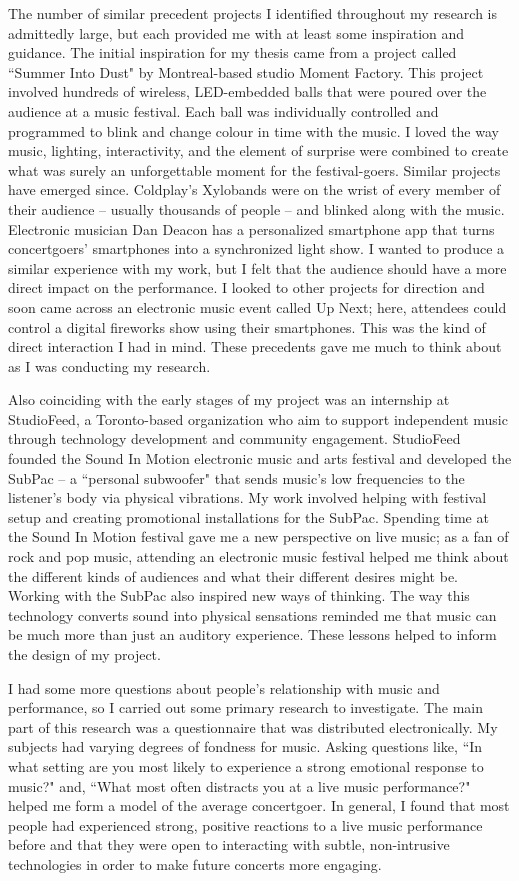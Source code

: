 The number of similar precedent projects I identified throughout my research is admittedly large, but each provided me with at least some inspiration and guidance. The initial inspiration for my thesis came from a project called ``Summer Into Dust" by Montreal-based studio Moment Factory. This project involved hundreds of wireless, LED-embedded balls that were poured over the audience at a music festival. Each ball was individually controlled and programmed to blink and change colour in time with the music. I loved the way music, lighting, interactivity, and the element of surprise were combined to create what was surely an unforgettable moment for the festival-goers. Similar projects have emerged since. Coldplay's Xylobands were on the wrist of every member of their audience -- usually thousands of people -- and blinked along with the music. Electronic musician Dan Deacon has a personalized smartphone app that turns concertgoers' smartphones into a synchronized light show. I wanted to produce a similar experience with my work, but I felt that the audience should have a more direct impact on the performance. I looked to other projects for direction and soon came across an electronic music event called Up Next; here, attendees could control a digital fireworks show using their smartphones. This was the kind of direct interaction I had in mind. These precedents gave me much to think about as I was conducting my research.

Also coinciding with the early stages of my project was an internship at StudioFeed, a Toronto-based organization who aim to support independent music through technology development and community engagement. StudioFeed founded the Sound In Motion electronic music and arts festival and developed the SubPac -- a ``personal subwoofer" that sends music's low frequencies to the listener's body via physical vibrations. My work involved helping with festival setup and creating promotional installations for the SubPac. Spending time at the Sound In Motion festival gave me a new perspective on live music; as a fan of rock and pop music, attending an electronic music festival helped me think about the different kinds of audiences and what their different desires might be. Working with the SubPac also inspired new ways of thinking. The way this technology converts sound into physical sensations reminded me that music can be much more than just an auditory experience. These lessons helped to inform the design of my project.

I had some more questions about people's relationship with music and performance, so I carried out some primary research to investigate. The main part of this research was a questionnaire that was distributed electronically. My subjects had varying degrees of fondness for music. Asking questions like, ``In what setting are you most likely to experience a strong emotional response to music?" and, ``What most often distracts you at a live music performance?" helped me form a model of the average concertgoer. In general, I found that most people had experienced strong, positive reactions to a live music performance before and that they were open to interacting with subtle, non-intrusive technologies in order to make future concerts more engaging.

